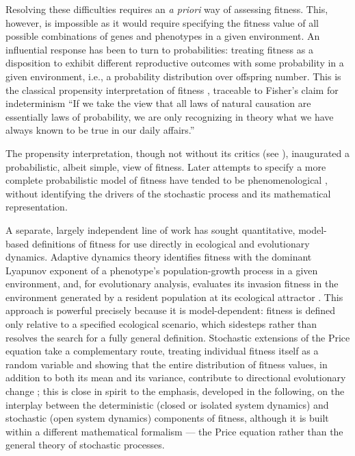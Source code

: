 \documentclass[12pt]{article}
\begin{document}
Resolving these difficulties requires an \textit{a priori} way of assessing fitness. This, however, is impossible as it would require specifying the fitness value of all possible combinations of genes and phenotypes in a given environment. An influential response has been to turn to probabilities: treating fitness as a disposition to exhibit different reproductive outcomes with some probability in a given environment, i.e., a probability distribution over offspring number. This is the classical propensity interpretation of fitness \cite{mills1979propensity}, traceable to Fisher's claim for indeterminism \citep{fisher1934indeterminism,suarez2022complex}``If we take the view that all laws of natural causation are essentially laws of probability, we are only recognizing in theory what we have always known to be true in our daily affairs.''


%
The propensity interpretation, though not without its critics (see \cite{beatty1989rethinking,brandon1990adaptation,sober2001two,abrams2009unity, suarez2022complex}), inaugurated a probabilistic, albeit simple, view of fitness. Later attempts to specify a more complete probabilistic model 
of fitness have tended to be phenomenological \cite{pence2013new}, without identifying the drivers of the stochastic process and its mathematical representation. 

A separate, largely independent line of work has sought quantitative, model-based definitions of fitness for use directly in ecological and evolutionary dynamics. Adaptive dynamics theory identifies fitness with the dominant Lyapunov exponent of a phenotype's population-growth process in a given environment, and, for evolutionary analysis, evaluates its invasion fitness in the environment generated by a resident population at its ecological attractor \cite{metz1992should}. This approach is powerful precisely because it is model-dependent: fitness is defined only relative to a specified ecological scenario, which sidesteps rather than resolves the search for a fully general definition. Stochastic extensions of the Price equation take a complementary route, treating individual fitness itself as a random variable and showing that the entire distribution of fitness values, in addition to both its mean and its variance, contribute to directional evolutionary change \cite{rice2008stochastic}; this is close in spirit to the emphasis, developed in the following, on the interplay between the deterministic (closed or isolated system dynamics) and stochastic (open system dynamics) components of fitness, although it is built within a different mathematical formalism — the Price equation rather than the general theory of stochastic processes.
\end{document}
